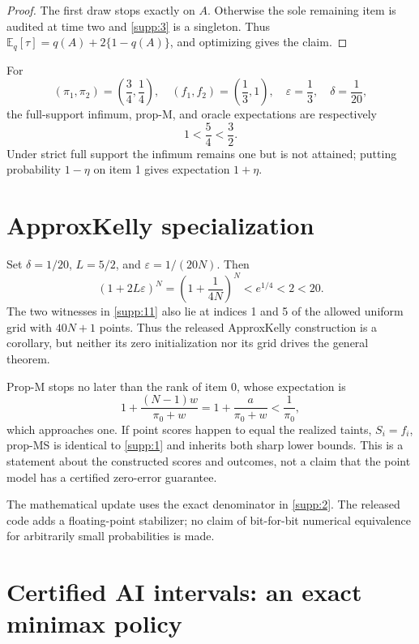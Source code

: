 \documentclass[11pt]{article}
\newcommand{\E}{\mathbb{E}}
\begin{document}
\begin{proof}
The first draw stops exactly on \(A\). Otherwise the sole remaining item is
audited at time two and \eqref{supp:3} is a singleton. Thus
\(\E_q[\tau]=q(A)+2\{1-q(A)\}\), and optimizing gives the claim.
\end{proof}

For
\[
 (\pi_1,\pi_2)=\left(\frac34,\frac14\right),\quad
 (f_1,f_2)=\left(\frac13,1\right),\quad
 \varepsilon=\frac13,\quad\delta=\frac1{20},
\]
the full-support infimum, prop-M, and oracle expectations are respectively
\begin{equation}\label{supp:7}
 1<\frac54<\frac32.
\end{equation}
Under strict full support the infimum remains one but is not attained; putting
probability \(1-\eta\) on item 1 gives expectation \(1+\eta\).

\section{ApproxKelly specialization}
Set \(\delta=1/20\), \(L=5/2\), and
\(\varepsilon=1/(20N)\). Then
\[
 (1+2L\varepsilon)^N
 =\left(1+\frac1{4N}\right)^N<e^{1/4}<2<20.
\]
The two witnesses in \eqref{supp:11} also lie at indices 1 and 5 of the allowed uniform
grid with \(40N+1\) points. Thus the released ApproxKelly construction is a
corollary, but neither its zero initialization nor its grid drives the general
theorem.

Prop-M stops no later than the rank of item \(0\), whose expectation is
\begin{equation}\label{supp:17}
 1+\frac{(N-1)w}{\pi_0+w}
 =1+\frac{a}{\pi_0+w}<\frac1{\pi_0},
\end{equation}
which approaches one. If point scores happen to equal the realized taints,
\(S_i=f_i\), prop-MS is identical to \eqref{supp:1} and inherits both sharp lower bounds.
This is a statement about the constructed scores and outcomes, not a claim that
the point model has a certified zero-error guarantee.

The mathematical update uses the exact denominator in \eqref{supp:2}. The released
code adds a floating-point stabilizer; no claim of bit-for-bit numerical
equivalence for arbitrarily small probabilities is made.
\section{Certified AI intervals: an exact minimax policy}
\end{document}
